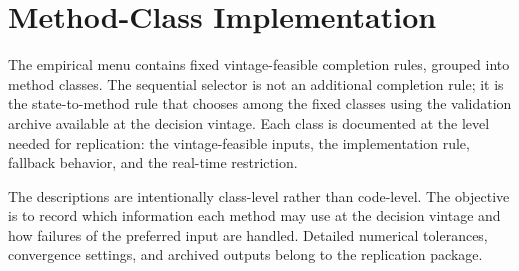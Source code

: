 \documentclass[a4paper,12pt]{article}
\newcommand{\1}{\mathbf{1}}
\begin{document}
\section{Method-Class Implementation}
\label{ia:procedure_classes}

The empirical menu contains fixed vintage-feasible completion rules, grouped into method classes. The sequential selector is not an additional completion rule; it is the state-to-method rule that chooses among the fixed classes using the validation archive available at the decision vintage. Each class is documented at the level needed for replication: the vintage-feasible inputs, the implementation rule, fallback behavior, and the real-time restriction.

The descriptions are intentionally class-level rather than code-level. The objective is to record which information each method may use at the decision vintage and how failures of the preferred input are handled. Detailed numerical tolerances, convergence settings, and archived outputs belong to the replication package.
\end{document}
